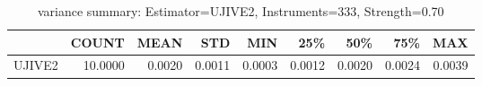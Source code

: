 \begin{table}[ht]
\centering
\caption{variance summary: Estimator=UJIVE2, Instruments=333, Strength=0.70}
\begin{tabular}{lrrrrrrrr}
\toprule
 & COUNT & MEAN & STD & MIN & 25\% & 50\% & 75\% & MAX \\
\midrule
UJIVE2 & 10.0000 & 0.0020 & 0.0011 & 0.0003 & 0.0012 & 0.0020 & 0.0024 & 0.0039 \\
\bottomrule
\end{tabular}
\end{table}
